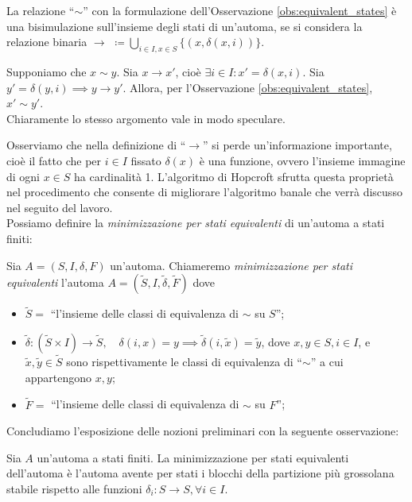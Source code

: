 \begin{observation}
    La relazione ``$\sim$'' con la formulazione dell'Osservazione \ref*{obs:equivalent_states} è una bisimulazione sull'insieme degli stati di un'automa, se si considera la relazione binaria $\displaystyle \to \,\,\coloneqq \bigcup_{i \in I, x \in S} \{(x,\delta(x,i))\}$.
\end{observation}
\begin{proof2}
    Supponiamo che $x \sim y$. Sia $x \to x'$, cioè $\exists i \in I : x' = \delta(x,i)$. Sia $y' = \delta(y,i) \implies y \to y'$. Allora, per l'Osservazione \ref*{obs:equivalent_states}, $x' \sim y'$.\\
    Chiaramente lo stesso argomento vale in modo speculare.
\end{proof2}
Osserviamo che nella definizione di ``$\to$'' si perde un'informazione importante, cioè il fatto che per $i \in I$ fissato $\delta(x)$ è una funzione, ovvero l'insieme immagine di ogni $x \in S$ ha cardinalità 1. L'algoritmo di Hopcroft sfrutta questa proprietà nel procedimento che consente di migliorare l'algoritmo banale che verrà discusso nel seguito del lavoro.\\
Possiamo definire la \emph{minimizzazione per stati equivalenti} di un'automa a stati finiti:
\begin{definition}\label{def:minim_eq_states}
    Sia $A = (S,I,\delta,F)$ un'automa. Chiameremo \emph{minimizzazione per stati equivalenti} l'automa $A = (\widetilde{S}, I, \widetilde{\delta}, \widetilde{F})$ dove
    \begin{itemize}
        \item $\widetilde{S} =$ ``l'insieme delle classi di equivalenza di $\sim$ su $S$'';
        \item $\widetilde{\delta} : (\widetilde{S} \times I) \to \widetilde{S}, \quad \delta(i, x) = y \implies \widetilde{\delta}(i,\widetilde{x}) = \widetilde{y}$, dove $x,y \in S, i \in I$, e $\widetilde{x}, \widetilde{y} \in \widetilde{S}$ sono rispettivamente le classi di equivalenza di ``$\sim$'' a cui appartengono $x,y$;
        \item $\widetilde{F} =$ ``l'insieme delle classi di equivalenza di $\sim$ su $F$'';
    \end{itemize}
\end{definition}
Concludiamo l'esposizione delle nozioni preliminari con la seguente osservazione:
\begin{observation}
    Sia $A$ un'automa a stati finiti. La minimizzazione per stati equivalenti dell'automa è l'automa avente per stati i blocchi della partizione più grossolana stabile rispetto alle funzioni $\delta_i : S \to S, \forall i \in I$.
\end{observation}
